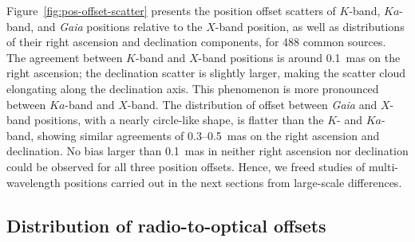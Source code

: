 \documentclass{aa}
\begin{document}
   Figure~\ref{fig:pos-offset-scatter} presents the position offset scatters of $K$-band, $Ka$-band, and \textit{Gaia} positions relative to the $X$-band position, as well as distributions of their right ascension and declination components, for 488 common sources.
   The agreement between $K$-band and $X$-band positions is around 0.1~mas on the right ascension;
   the declination scatter is slightly larger, making the scatter cloud elongating along the declination axis.
   This phenomenon is more pronounced between $Ka$-band and $X$-band.
   The distribution of offset between \textit{Gaia} and $X$-band positions, with a nearly circle-like shape, is flatter than the $K$- and $Ka$-band, showing similar agreements of 0.3--0.5~mas on the right ascension and declination.
   No bias larger than 0.1~mas in neither right ascension nor declination could be observed for all three position offsets.
   Hence, we freed studies of multi-wavelength positions carried out in the next sections from large-scale differences. %
%

\subsection{Distribution of radio-to-optical offsets}    \label{subsec:r2o-dist}
\end{document}
